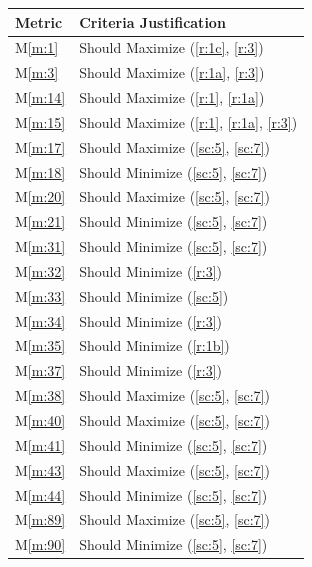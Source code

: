 \documentclass{report}
\newcommand{\mref}[1]{M\ref{#1}}
\begin{document}
\begin{tabular}{|l|p{14.35cm}|}
    \hline
    \textbf{Metric} & \textbf{Criteria \hfill Justification} \\
    \hline
    \mref{m:1} & Should Maximize \hfill (\ref{r:1c}, \ref{r:3}) \\
    \hline
    \mref{m:3} & Should Maximize \hfill (\ref{r:1a}, \ref{r:3}) \\
    \hline
    \mref{m:14} & Should Maximize \hfill (\ref{r:1}, \ref{r:1a}) \\
    \hline
    \mref{m:15} & Should Maximize \hfill (\ref{r:1}, \ref{r:1a}, \ref{r:3}) \\
    \hline
    \mref{m:17} & Should Maximize \hfill (\ref{sc:5}, \ref{sc:7}) \\
    \hline
    \mref{m:18} & Should Minimize \hfill (\ref{sc:5}, \ref{sc:7}) \\
    \hline
    \mref{m:20} & Should Maximize \hfill (\ref{sc:5}, \ref{sc:7}) \\
    \hline
    \mref{m:21} & Should Minimize \hfill (\ref{sc:5}, \ref{sc:7}) \\
    \hline
    \mref{m:31} & Should Minimize \hfill (\ref{sc:5}, \ref{sc:7}) \\
    \hline
    \mref{m:32} & Should Minimize \hfill (\ref{r:3}) \\
    \hline
    \mref{m:33} & Should Minimize \hfill (\ref{sc:5}) \\
    \hline
    \mref{m:34} & Should Minimize \hfill (\ref{r:3}) \\
    \hline
    \mref{m:35} & Should Minimize \hfill (\ref{r:1b}) \\
    \hline
    \mref{m:37} & Should Minimize \hfill (\ref{r:3}) \\
    \hline
    \mref{m:38} & Should Maximize \hfill (\ref{sc:5}, \ref{sc:7}) \\
    \hline
    \mref{m:40} & Should Maximize \hfill (\ref{sc:5}, \ref{sc:7}) \\
    \hline
    \mref{m:41} & Should Minimize \hfill (\ref{sc:5}, \ref{sc:7}) \\
    \hline
    \mref{m:43} & Should Maximize \hfill (\ref{sc:5}, \ref{sc:7}) \\
    \hline
    \mref{m:44} & Should Minimize \hfill (\ref{sc:5}, \ref{sc:7}) \\
    \hline
    \mref{m:89} & Should Maximize \hfill (\ref{sc:5}, \ref{sc:7}) \\
    \hline
    \mref{m:90} & Should Minimize \hfill (\ref{sc:5}, \ref{sc:7}) \\

\end{tabular}
\end{document}
